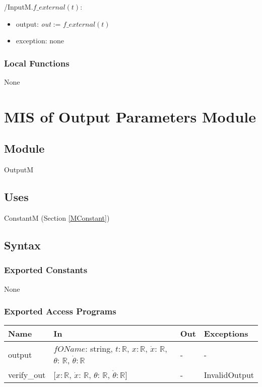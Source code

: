 \documentclass[12pt, titlepage]{article}
\begin{document}
\noindent /InputM.$f\_external(t)$:
\begin{itemize}
\item output: \textit{out} := $f\_external(t)$
\item exception: none
\end{itemize}\noindent 


\subsubsection{Local Functions}
None

\newpage
\section{MIS of Output Parameters Module\label{MOutput} }


\subsection{Module}
OutputM

\subsection{Uses}
ConstantM (Section \ref{MConstant})

\subsection{Syntax}

\subsubsection{Exported Constants}
None
\subsubsection{Exported Access Programs}

\begin{center}
\begin{tabular}{p{2cm} p{8cm} p{2cm} p{2cm}}
\hline
\textbf{Name} & \textbf{In} & \textbf{Out} & \textbf{Exceptions} \\
\hline
 output& $fOName$: string, $t$$: \mathbb{R}$, $x$$: \mathbb{R}$, $\dot{x}$: $\mathbb{R}$, $\theta$: $\mathbb{R}$, $\dot{\theta}$$: 
 \mathbb{R}$ & - & -\\
\hline
verify\_out&  [$x$$: \mathbb{R}$, $\dot{x}$: $\mathbb{R}$, $\theta$: $\mathbb{R}$, $\dot{\theta}$$: 
 \mathbb{R}$] & - & InvalidOutput \\
\end{tabular}
\end{center}
\end{document}

